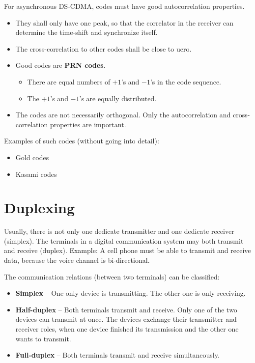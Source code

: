 \begin{refsection}
For asynchronous \ac{DS-CDMA}, codes must have good autocorrelation properties.
\begin{itemize}
	\item They shall only have one peak, so that the correlator in the receiver can determine the time-shift and synchronize itself.
	\item The cross-correlation to other codes shall be close to uero.
	\item Good codes are  \textbf{\acf{PRN} codes}.
	\begin{itemize}
		\item There are equal numbers of $+1$'s and $-1$'s in the code sequence.
		\item The $+1$'s and $-1$'s are equally distributed.
	\end{itemize}
	\item The codes are not necessarily orthogonal. Only the autocorrelation and cross-correlation properties are important.
\end{itemize}

Examples of such codes (without going into detail):
\begin{itemize}
	\item Gold codes
	\item Kasami codes
\end{itemize}


\section{Duplexing}

Usually, there is not only one dedicate transmitter and one dedicate receiver (simplex). The terminals in a digital communication system may both transmit and receive (duplex). Example: A cell phone must be able to transmit and receive data, because the voice channel is bi-directional.

The communication relations (between two terminals) can be classified:
\begin{itemize}
	\item \textbf{Simplex} -- One only device is transmitting. The other one is only receiving.
	\item \textbf{Half-duplex} -- Both terminals transmit and receive. Only one of the two devices can transmit at once. The devices exchange their transmitter and receiver roles, when one device finished its transmission and the other one wants to transmit.
	\item \textbf{Full-duplex} -- Both terminals transmit and receive simultaneously.
\end{itemize}


\end{refsection}
